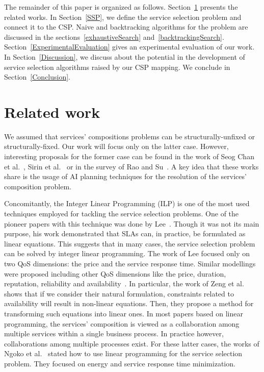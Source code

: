 \documentclass[a4paper]{article}
\begin{document}
The remainder of this paper is organized as follows. Section~\ref{Related} presents the related works. 
In Section~\ref{SSP}, we define the service selection problem and connect it to the CSP. Naive and backtracking 
algorithms for the problem are discussed in the sections~\ref{exhaustiveSearch} and~\ref{backtrackingSearch}. 
Section~\ref{ExperimentalEvaluation} gives an experimental evaluation of our work. In Section~\ref{Discussion}, we 
discuss about the potential in the development of service selection algorithms raised by our CSP mapping.  We 
conclude in Section~\ref{Conclusion}. 


\section{Related work} \label{Related}

We assumed that services' compositions problems can be structurally-unfixed or structurally-fixed. 
Our work will focus only on the latter case. However, interesting 
proposals for the former case can be found in the work of Seog Chan et al.~\cite{Oh05acomparative}, 
Sirin et al.~\cite{Sirin:2004:HPW:1741306.1741331} or in the survey of Rao and Su~\cite{Rao04asurvey}. A key idea 
that these works share is the usage of AI planning techniques for the resolution of the services' composition problem. 

Concomitantly, the Integer Linear Programming (ILP) is one of the most used techniques employed for tackling the service 
selection problems. One of the pioneer papers with this technique was done by Lee~\cite{Lee}. 
Though it was not its main purpose, his work demonstrated that SLAs can, in practice,  
be formulated as linear equations. This suggests that in many cases, the service selection problem can 
be solved by integer linear programming. The work of Lee focused only on two QoS dimensions: the price and the 
service response time. Similar modellings were proposed including other QoS dimensions like the
price, duration, reputation, reliability and availability~\cite{ZengMiddleware,Yu,Ardagna}. In particular, 
the work of Zeng et al.~\cite{ZengMiddleware} shows that if we consider their natural formulation, 
constraints related to availability will result in non-linear equations. Then, they propose a method for 
transforming such equations into linear ones. In most papers based on linear programming, 
the services' composition is viewed as a collaboration among multiple services within a single 
business process. In practice however, collaborations among multiple processes exist. For these latter 
cases, the works of Ngoko et al.~\cite{JISA,mgc2012} stated how to use linear programming for the 
service selection problem. They focused on energy and service response time minimization.
\end{document}
